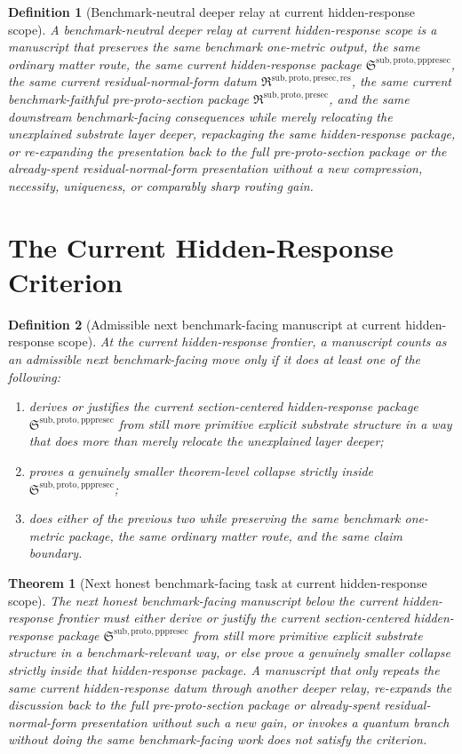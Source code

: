 \documentclass[11pt]{article}
\newcommand{\PreProtoSectionPackage}{\mathfrak R^{\mathrm{sub,proto,presec}}}
\newcommand{\PreProtoSectionResidualPackage}{\mathfrak R^{\mathrm{sub,proto,presec,res}}}
\newcommand{\PrePreProtoSectionPackage}{\mathfrak S^{\mathrm{sub,proto,pppresec}}}
\newtheorem{definition}{Definition}
\newtheorem{theorem}{Theorem}
\begin{document}
\begin{definition}[Benchmark-neutral deeper relay at current hidden-response scope]
A \emph{benchmark-neutral deeper relay at current hidden-response scope} is a manuscript that preserves the same benchmark one-metric output, the same ordinary matter route, the same current hidden-response package \(\PrePreProtoSectionPackage\), the same current residual-normal-form datum \(\PreProtoSectionResidualPackage\), the same current benchmark-faithful pre-proto-section package \(\PreProtoSectionPackage\), and the same downstream benchmark-facing consequences while merely relocating the unexplained substrate layer deeper, repackaging the same hidden-response package, or re-expanding the presentation back to the full pre-proto-section package or the already-spent residual-normal-form presentation without a new compression, necessity, uniqueness, or comparably sharp routing gain.
\end{definition}

\section{The Current Hidden-Response Criterion}

\begin{definition}[Admissible next benchmark-facing manuscript at current hidden-response scope]
At the current hidden-response frontier, a manuscript counts as an admissible next benchmark-facing move only if it does at least one of the following:
\begin{enumerate}
    \item derives or justifies the current section-centered hidden-response package \(\PrePreProtoSectionPackage\) from still more primitive explicit substrate structure in a way that does more than merely relocate the unexplained layer deeper;
    \item proves a genuinely smaller theorem-level collapse strictly inside \(\PrePreProtoSectionPackage\);
    \item does either of the previous two while preserving the same benchmark one-metric package, the same ordinary matter route, and the same claim boundary.
\end{enumerate}
\end{definition}

\begin{theorem}[Next honest benchmark-facing task at current hidden-response scope]
The next honest benchmark-facing manuscript below the current hidden-response frontier must either derive or justify the current section-centered hidden-response package \(\PrePreProtoSectionPackage\) from still more primitive explicit substrate structure in a benchmark-relevant way, or else prove a genuinely smaller collapse strictly inside that hidden-response package. A manuscript that only repeats the same current hidden-response datum through another deeper relay, re-expands the discussion back to the full pre-proto-section package or already-spent residual-normal-form presentation without such a new gain, or invokes a quantum branch without doing the same benchmark-facing work does not satisfy the criterion.
\end{theorem}
\end{document}
